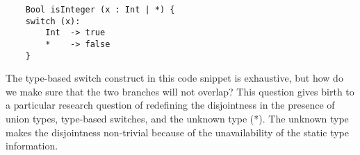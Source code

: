 \begin{lstlisting}
    Bool isInteger (x : Int | *) {
    switch (x):
        Int  -> true
        *    -> false
    }
\end{lstlisting}

The type-based switch construct in this code snippet is exhaustive, but
how do we make sure that the two branches will not overlap?
This question gives birth to a particular research question
of redefining the disjointness in the presence of union types,
type-based switches, and the unknown type (*).
The unknown type makes the disjointness non-trivial because
of the unavailability of the static type information.

